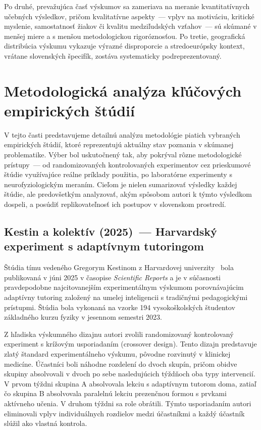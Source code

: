 Po druhé, prevažujúca časť výskumov sa zameriava na meranie kvantitatívnych učebných výsledkov, pričom kvalitatívne aspekty~--- vplyv na motiváciu, kritické myslenie, samostatnosť žiakov či kvalitu medziľudských vzťahov~--- sú skúmané v menšej miere a s menšou metodologickou rigoróznosťou. Po tretie, geografická distribúcia výskumu vykazuje výrazné disproporcie a stredoeurópsky kontext, vrátane slovenských špecifík, zostáva systematicky podreprezentovaný.


\section{Metodologická analýza kľúčových empirických štúdií}
\label{sec:metodologia}

V tejto časti predstavujeme detailnú analýzu metodológie piatich vybraných empirických štúdií, ktoré reprezentujú aktuálny stav poznania v skúmanej problematike. Výber bol uskutočnený tak, aby pokrýval rôzne metodologické prístupy~--- od randomizovaných kontrolovaných experimentov cez prieskumové štúdie využívajúce reálne príklady použitia, po laboratórne experimenty s neurofyziologickým meraním. Cieľom je nielen sumarizovať výsledky každej štúdie, ale predovšetkým analyzovať, akým spôsobom autori k týmto výsledkom dospeli, a posúdiť replikovateľnosť ich postupov v slovenskom prostredí.


\subsection{Kestin a kolektív (2025)~--- Harvardský experiment s adaptívnym tutoringom}

Štúdia tímu vedeného Gregorym Kestinom z Harvardovej univerzity~\cite{kestin2025aitutoring} bola publikovaná v júni 2025 v časopise \textit{Scientific Reports} a je v súčasnosti pravdepodobne najcitovanejším experimentálnym výskumom porovnávajúcim adaptívny tutoring založený na umelej inteligencii s tradičnými pedagogickými prístupmi. Štúdia bola vykonaná na vzorke 194 vysokoškolských študentov základného kurzu fyziky v jesennom semestri 2023.

Z hľadiska výskumného dizajnu autori zvolili randomizovaný kontrolovaný experiment s krížovým usporiadaním (crossover design). Tento dizajn predstavuje zlatý štandard experimentálneho výskumu, pôvodne rozvinutý v klinickej medicíne. Účastníci boli náhodne rozdelení do dvoch skupín, pričom obidve skupiny absolvovali v dvoch po sebe nasledujúcich týždňoch oba typy intervencií. V prvom týždni skupina A absolvovala lekciu s adaptívnym tutorom doma, zatiaľ čo skupina B absolvovala paralelnú lekciu prezenčnou formou s prvkami aktívneho učenia. V druhom týždni sa role obrátili. Týmto usporiadaním autori eliminovali vplyv individuálnych rozdielov medzi účastníkmi a každý účastník slúžil ako vlastná kontrola.

